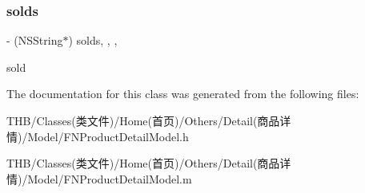 \subsubsection{\texorpdfstring{solds}{solds}}
{\footnotesize\ttfamily -\/ (N\+S\+String$\ast$) solds\hspace{0.3cm}{\ttfamily [read]}, {\ttfamily [write]}, {\ttfamily [nonatomic]}, {\ttfamily [copy]}}

sold 

The documentation for this class was generated from the following files\+:\begin{DoxyCompactItemize}
\item 
T\+H\+B/\+Classes(类文件)/\+Home(首页)/\+Others/\+Detail(商品详情)/\+Model/F\+N\+Product\+Detail\+Model.\+h\item 
T\+H\+B/\+Classes(类文件)/\+Home(首页)/\+Others/\+Detail(商品详情)/\+Model/F\+N\+Product\+Detail\+Model.\+m\end{DoxyCompactItemize}
